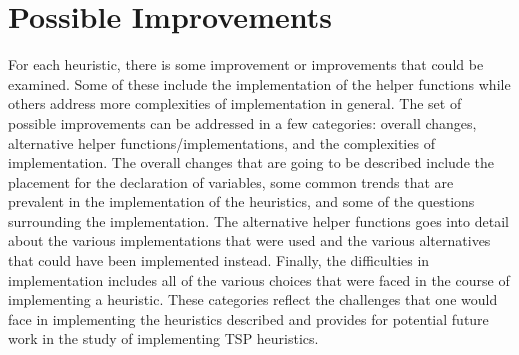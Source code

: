 \documentclass[midd]{thesis}
\newcommand{\tab}{\hspace*{2em}}
\begin{document}
\chapter{Possible Improvements}
\tab For each heuristic, there is some improvement or improvements that could be examined. Some of these include the implementation of the helper functions while others address more complexities of implementation in general. The set of possible improvements can be addressed in a few categories: overall changes, alternative helper functions/implementations, and the complexities of implementation. The overall changes that are going to be described include the placement for the declaration of variables, some common trends that are prevalent in the implementation of the heuristics, and some of the questions surrounding the implementation. The alternative helper functions goes into detail about the various implementations that were used and the various alternatives that could have been implemented instead. Finally, the difficulties in implementation includes all of the various choices that were faced in the course of implementing a heuristic. These categories reflect the challenges that one would face in implementing the heuristics described and provides for potential future work in the study of implementing TSP heuristics.\\
\end{document}
